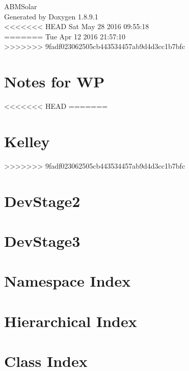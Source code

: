 \documentclass[twoside]{book}
\newcommand{\+}{\discretionary{\mbox{\scriptsize$\hookleftarrow$}}{}{}}
\newcommand{\clearemptydoublepage}{%
  \newpage{\pagestyle{empty}\cleardoublepage}%
}
\begin{document}
\hypersetup{pageanchor=false,
             bookmarks=true,
             bookmarksnumbered=true,
             pdfencoding=unicode
            }
\begin{titlepage}
\vspace*{7cm}
\begin{center}%
{\Large A\+B\+M\+Solar }\\
\vspace*{1cm}
{\large Generated by Doxygen 1.8.9.1}\\
\vspace*{0.5cm}
<<<<<<< HEAD
{\small Sat May 28 2016 09:55:18}\\
=======
{\small Tue Apr 12 2016 21:57:10}\\
>>>>>>> 9fadf023062505cb443534457ab9d4d3cc1b7bfc
\end{center}
\end{titlepage}
\clearemptydoublepage
\tableofcontents
\clearemptydoublepage
{}
\hypersetup{pageanchor=true}

\chapter{Notes for W\+P}
\label{wp}
\hypertarget{wp}{}

<<<<<<< HEAD
=======
\chapter{Kelley}
\label{_kelley}
\hypertarget{_kelley}{}

>>>>>>> 9fadf023062505cb443534457ab9d4d3cc1b7bfc
\chapter{Dev\+Stage2}
\label{_dev_stage2}
\hypertarget{_dev_stage2}{}

\chapter{Dev\+Stage3}
\label{_dev_stage3}
\hypertarget{_dev_stage3}{}

\chapter{Namespace Index}

\chapter{Hierarchical Index}

\chapter{Class Index}

\end{document}
